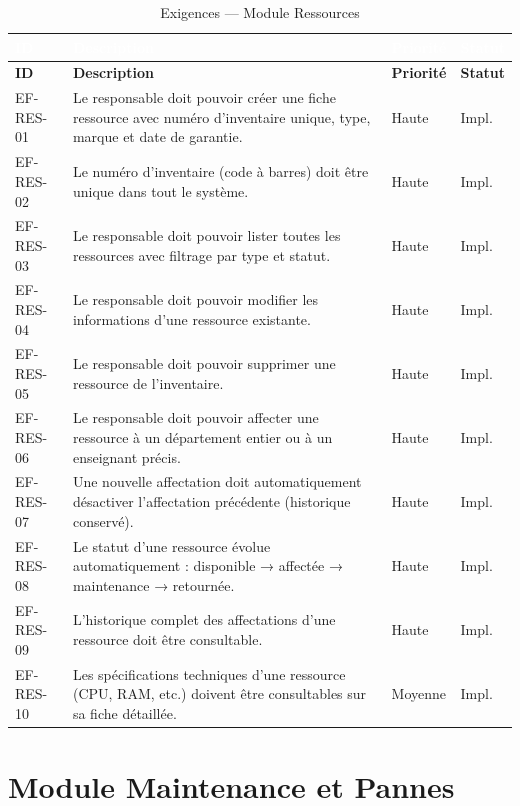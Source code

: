 \documentclass[12pt,a4paper]{report}
\begin{document}
\begin{longtable}{|C{1.8cm}|L{8.5cm}|C{2cm}|C{2cm}|}
\caption{Exigences — Module Ressources} \\
\hline
{}\textcolor{white}{\textbf{ID}} & \textcolor{white}{\textbf{Description}} & \textcolor{white}{\textbf{Priorité}} & \textcolor{white}{\textbf{Statut}} \\
\hline
\endfirsthead
\hline
\textbf{ID} & \textbf{Description} & \textbf{Priorité} & \textbf{Statut} \\
\hline
\endhead
EF-RES-01 & Le responsable doit pouvoir créer une fiche ressource avec numéro d'inventaire unique, type, marque et date de garantie. & Haute & Impl. \\
\hline
EF-RES-02 & Le numéro d'inventaire (code à barres) doit être unique dans tout le système. & Haute & Impl. \\
\hline
EF-RES-03 & Le responsable doit pouvoir lister toutes les ressources avec filtrage par type et statut. & Haute & Impl. \\
\hline
EF-RES-04 & Le responsable doit pouvoir modifier les informations d'une ressource existante. & Haute & Impl. \\
\hline
EF-RES-05 & Le responsable doit pouvoir supprimer une ressource de l'inventaire. & Haute & Impl. \\
\hline
EF-RES-06 & Le responsable doit pouvoir affecter une ressource à un département entier ou à un enseignant précis. & Haute & Impl. \\
\hline
EF-RES-07 & Une nouvelle affectation doit automatiquement désactiver l'affectation précédente (historique conservé). & Haute & Impl. \\
\hline
EF-RES-08 & Le statut d'une ressource évolue automatiquement : disponible → affectée → maintenance → retournée. & Haute & Impl. \\
\hline
EF-RES-09 & L'historique complet des affectations d'une ressource doit être consultable. & Haute & Impl. \\
\hline
EF-RES-10 & Les spécifications techniques d'une ressource (CPU, RAM, etc.) doivent être consultables sur sa fiche détaillée. & Moyenne & Impl. \\
\hline
\end{longtable}

\section{Module Maintenance et Pannes}
\end{document}
